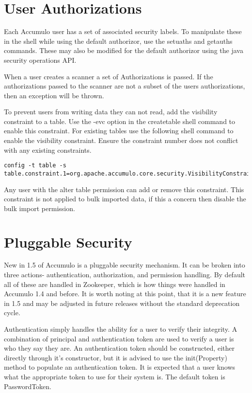 \section{User Authorizations}

Each Accumulo user has a set of associated security labels. To manipulate
these in the shell while using the default authorizor, use the setuaths and getauths commands.
These may also be modified for the default authorizor using the java security operations API. 

When a user creates a scanner a set of Authorizations is passed. If the
authorizations passed to the scanner are not a subset of the users
authorizations, then an exception will be thrown.

To prevent users from writing data they can not read, add the visibility
constraint to a table. Use the -evc option in the createtable shell command to
enable this constraint. For existing tables use the following shell command to
enable the visibility constraint. Ensure the constraint number does not
conflict with any existing constraints.
  
\begingroup\fontsize{8pt}{8pt}\selectfont\begin{verbatim}
config -t table -s table.constraint.1=org.apache.accumulo.core.security.VisibilityConstraint
\end{verbatim}\endgroup

Any user with the alter table permission can add or remove this constraint.
This constraint is not applied to bulk imported data, if this a concern then
disable the bulk import permission.

\section{Pluggable Security}

New in 1.5 of Accumulo is a pluggable security mechanism. It can be broken into three actions-
authentication, authorization, and permission handling. By default all of these are handled in
Zookeeper, which is how things were handled in Accumulo 1.4 and before. It is worth noting at this
point, that it is a new feature in 1.5 and may be adjusted in future releases without the standard
deprecation cycle.

Authentication simply handles the ability for a user to verify their integrity. A combination of 
principal and authentication token are used to verify a user is who they say they are. An 
authentication token should be constructed, either directly through it's constructor, but it is 
advised to use the init(Property) method to populate an authentication token. It is expected that a 
user knows what the appropriate token to use for their system is. The default token is 
PasswordToken. 

